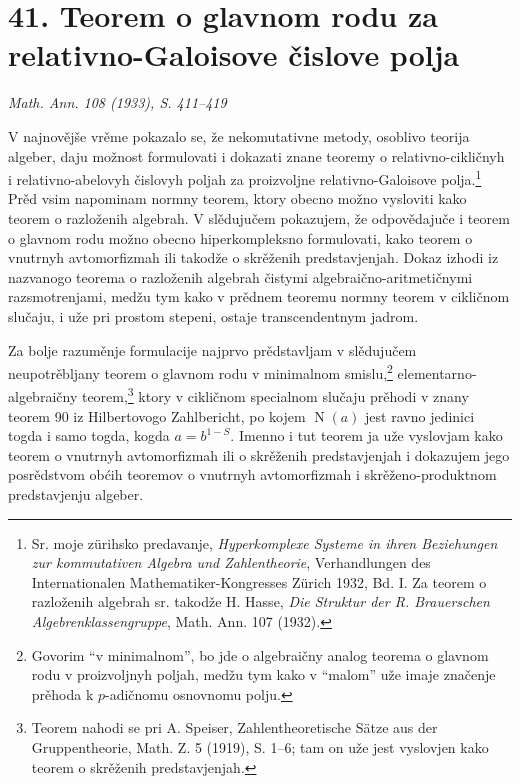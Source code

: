 \documentclass[11pt]{article}
\newcommand{\foreign}[1]{#1}
\providecommand{\Norm}{\operatorname{N}}
\begin{document}
\section*{41. Teorem o glavnom rodu za relativno-Galoisove čislove polja}

\begin{center}
\emph{\foreign{Math. Ann. 108 (1933), S. 411--419}}
\end{center}

V najnovějše vrěme pokazalo se, že nekomutativne metody, osoblivo teorija algeber, daju možnost formulovati i dokazati znane teoremy o relativno-cikličnyh i relativno-abelovyh čislovyh poljah za proizvoljne relativno-Galoisove polja.\footnote{Sr. moje zürihsko predavanje, \foreign{\emph{Hyperkomplexe Systeme in ihren Beziehungen zur kommutativen Algebra und Zahlentheorie}}, Verhandlungen des Internationalen Mathematiker-Kongresses Zürich 1932, Bd. I. Za teorem o razloženih algebrah sr. takodže H. Hasse, \foreign{\emph{Die Struktur der R. Brauerschen Algebrenklassengruppe}}, Math. Ann. 107 (1932).} Prěd vsim napominam normny teorem, ktory obecno možno vysloviti kako teorem o razloženih algebrah. V slědujučem pokazujem, že odpovědajuče i teorem o glavnom rodu možno obecno hiperkompleksno formulovati, kako teorem o vnutrnyh avtomorfizmah ili takodže o skrěženih predstavjenjah. Dokaz izhodi iz nazvanogo teorema o razloženih algebrah čistymi algebraično-aritmetičnymi razsmotrenjami, medžu tym kako v prědnem teoremu normny teorem v cikličnom slučaju, i uže pri prostom stepeni, ostaje transcendentnym jadrom.

Za bolje razuměnje formulacije najprvo prědstavljam v slědujučem neupotrěbljany teorem o glavnom rodu v minimalnom smislu,\footnote{Govorim ``v minimalnom'', bo jde o algebraičny analog teorema o glavnom rodu v proizvoljnyh poljah, medžu tym kako v ``malom'' uže imaje značenje prěhoda k \(p\)-adičnomu osnovnomu polju.} elementarno-algebraičny teorem,\footnote{Teorem nahodi se pri A. Speiser, \foreign{Zahlentheoretische Sätze aus der Gruppentheorie}, Math. Z. 5 (1919), S. 1--6; tam on uže jest vyslovjen kako teorem o skrěženih predstavjenjah.} ktory v cikličnom specialnom slučaju prěhodi v znany teorem 90 iz Hilbertovogo \foreign{Zahlbericht}, po kojem \(\Norm(a)\) jest ravno jedinici togda i samo togda, kogda \(a=b^{1-S}\). Imenno i tut teorem ja uže vyslovjam kako teorem o vnutrnyh avtomorfizmah ili o skrěženih predstavjenjah i dokazujem jego posrědstvom obćih teoremov o vnutrnyh avtomorfizmah i skrěženo-produktnom predstavjenju algeber.
\end{document}
